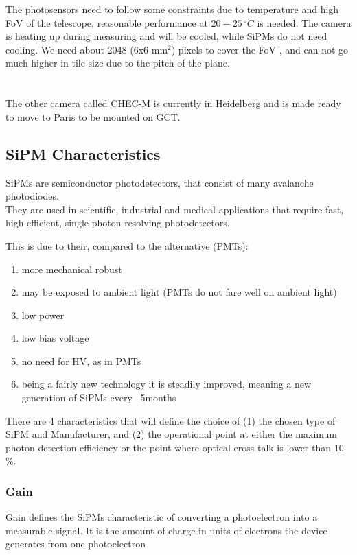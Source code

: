 \documentclass[article,type=pp,colorback,accentcolor=tud9c]{tudthesis}
\begin{document}
	The photosensors need to follow some constraints due to temperature and high FoV of the telescope,
	reasonable performance at $20 { - } 25\,^{\circ}C$ is needed. The camera is heating up during measuring and will be cooled, while SiPMs do not need cooling.
	We need about 2048 (6x6 mm$^2$) pixels to cover the FoV , and can not go much higher in tile size due to the pitch of the plane.\\
\\  \\ 
	The other camera called CHEC-M is currently in Heidelberg and is made ready to move to Paris to be mounted on GCT.\\
\newpage
    \subsection{SiPM Characteristics}
	SiPMs are semiconductor photodetectors, that consist of many avalanche photodiodes. \\
	They are used in scientific, industrial and medical applications that require fast, high-efficient, single photon resolving	photodetectors.

	This is due to their, compared to the alternative (PMTs):
	\begin{enumerate}
	\item more mechanical robust
	\item may be exposed to ambient light (PMTs do not fare well on ambient light)
	\item low power
	\item low bias voltage
	\item no need for HV, as in PMTs
	\item being a fairly new technology it is steadily improved, meaning a new generation of SiPMs every ~5months
	\end{enumerate}

	There are 4 characteristics that will define the choice of (1) the chosen type of SiPM and Manufacturer, and (2) the operational point at either the maximum photon detection efficiency or the point where optical cross talk is lower than 10 \%. 

    \subsubsection{Gain}
    Gain defines the SiPMs characteristic of converting a photoelectron into a measurable signal. It is the amount of charge in units of electrons the device generates from one photoelectron
\end{document}
